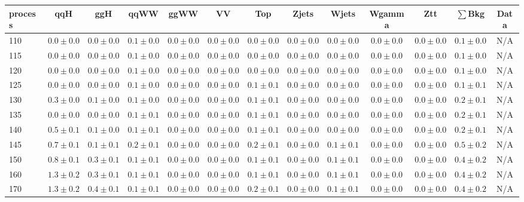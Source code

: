 \begin{table}
{%
 \tiny
 \begin{center}
 \begin{tabular}{l | c c | c c c c c c c c  | c c}
 \hline
 process & qqH & ggH & qqWW & ggWW & VV & Top & Zjets & Wjets & Wgamma & Ztt & $\sum$Bkg & Data \\
 \hline
110 & $0.0\pm0.0$ & $0.0\pm0.0$ & $0.1\pm0.0$ & $0.0\pm0.0$ & $0.0\pm0.0$ & $0.0\pm0.0$ & $0.0\pm0.0$ & $0.0\pm0.0$ & $0.0\pm0.0$ & $0.0\pm0.0$ & $0.1\pm0.0$ & N/A \\
115 & $0.0\pm0.0$ & $0.0\pm0.0$ & $0.1\pm0.0$ & $0.0\pm0.0$ & $0.0\pm0.0$ & $0.0\pm0.0$ & $0.0\pm0.0$ & $0.0\pm0.0$ & $0.0\pm0.0$ & $0.0\pm0.0$ & $0.1\pm0.0$ & N/A \\
120 & $0.0\pm0.0$ & $0.0\pm0.0$ & $0.1\pm0.0$ & $0.0\pm0.0$ & $0.0\pm0.0$ & $0.0\pm0.0$ & $0.0\pm0.0$ & $0.0\pm0.0$ & $0.0\pm0.0$ & $0.0\pm0.0$ & $0.1\pm0.0$ & N/A \\
125 & $0.0\pm0.0$ & $0.0\pm0.0$ & $0.1\pm0.0$ & $0.0\pm0.0$ & $0.0\pm0.0$ & $0.1\pm0.1$ & $0.0\pm0.0$ & $0.0\pm0.0$ & $0.0\pm0.0$ & $0.0\pm0.0$ & $0.1\pm0.1$ & N/A \\
130 & $0.3\pm0.0$ & $0.1\pm0.0$ & $0.1\pm0.0$ & $0.0\pm0.0$ & $0.0\pm0.0$ & $0.1\pm0.1$ & $0.0\pm0.0$ & $0.0\pm0.0$ & $0.0\pm0.0$ & $0.0\pm0.0$ & $0.2\pm0.1$ & N/A \\
135 & $0.0\pm0.0$ & $0.0\pm0.0$ & $0.1\pm0.1$ & $0.0\pm0.0$ & $0.0\pm0.0$ & $0.1\pm0.1$ & $0.0\pm0.0$ & $0.0\pm0.0$ & $0.0\pm0.0$ & $0.0\pm0.0$ & $0.2\pm0.1$ & N/A \\
140 & $0.5\pm0.1$ & $0.1\pm0.0$ & $0.1\pm0.1$ & $0.0\pm0.0$ & $0.0\pm0.0$ & $0.1\pm0.1$ & $0.0\pm0.0$ & $0.0\pm0.0$ & $0.0\pm0.0$ & $0.0\pm0.0$ & $0.2\pm0.1$ & N/A \\
145 & $0.7\pm0.1$ & $0.1\pm0.1$ & $0.2\pm0.1$ & $0.0\pm0.0$ & $0.0\pm0.0$ & $0.2\pm0.1$ & $0.0\pm0.0$ & $0.1\pm0.1$ & $0.0\pm0.0$ & $0.0\pm0.0$ & $0.5\pm0.2$ & N/A \\
150 & $0.8\pm0.1$ & $0.3\pm0.1$ & $0.1\pm0.1$ & $0.0\pm0.0$ & $0.0\pm0.0$ & $0.1\pm0.1$ & $0.0\pm0.0$ & $0.1\pm0.1$ & $0.0\pm0.0$ & $0.0\pm0.0$ & $0.4\pm0.2$ & N/A \\
160 & $1.3\pm0.2$ & $0.3\pm0.1$ & $0.1\pm0.1$ & $0.0\pm0.0$ & $0.0\pm0.0$ & $0.1\pm0.1$ & $0.0\pm0.0$ & $0.1\pm0.1$ & $0.0\pm0.0$ & $0.0\pm0.0$ & $0.4\pm0.2$ & N/A \\
170 & $1.3\pm0.2$ & $0.4\pm0.1$ & $0.1\pm0.1$ & $0.0\pm0.0$ & $0.0\pm0.0$ & $0.2\pm0.1$ & $0.0\pm0.0$ & $0.1\pm0.1$ & $0.0\pm0.0$ & $0.0\pm0.0$ & $0.4\pm0.2$ & N/A \\

\end{tabular}
\end{center}}
\end{table}
